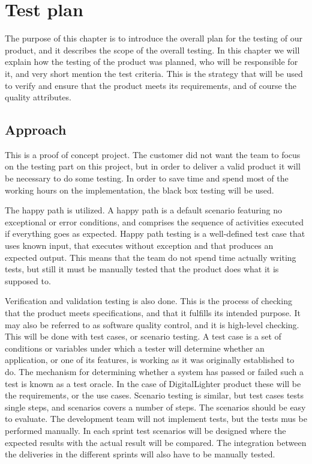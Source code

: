 \section{Test plan}
The purpose of this chapter is to introduce the overall plan for the testing of our product, and it describes the scope of the overall testing.
In this chapter we will explain how the testing of the product was planned, who will be responsible for it, and very short mention the test criteria.
This is the strategy that will be used to verify and ensure that the product meets its requirements, and of course the quality attributes. 

\subsection{Approach}

This is a proof of concept project. The customer did not want the team to focus on the testing part on this project, but in order to deliver a valid product it will be necessary to do some testing. In order to save time and spend most of the working hours on the implementation, the black box testing will be used.  

The happy path is utilized. A happy path is a default scenario featuring no exceptional or error conditions, and comprises the sequence of activities executed if everything goes as expected. Happy path testing is a well-defined test case that uses known input, that executes without exception and that produces an expected output. This means that the team do not spend time actually writing tests, but still it must be manually tested that the product does what it is supposed to.

Verification and validation testing is also done. 
This is the process of checking that the product meets specifications, and that it fulfills its intended purpose. It may also be referred to as software quality control, and it is high-level checking. 
This will be done with test cases, or scenario testing. 
A test case is a set of conditions or variables under which a tester will determine whether an application, or one of its features, is working as it was originally established to do. 
The mechanism for determining whether a system has passed or failed such a test is known as a test oracle. 
In the case of DigitalLighter product these will be the requirements, or the use cases. Scenario testing is similar, but test cases tests single steps, and scenarios covers a number of steps. 
The scenarios should be easy to evaluate. 
The development team will not implement tests, but the tests  mus be performed manually. 
In each sprint test scenarios will be designed where the expected results with the actual result will be compared.
The integration between the deliveries in the different sprints will also have to be manually tested. 

